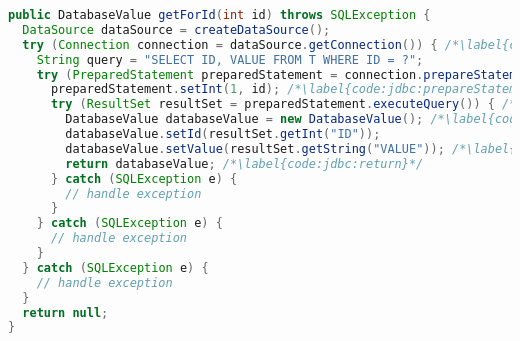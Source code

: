 
\begin{lstlisting}[language=Java, caption={Example of loading data using JDBC API \citep{JDBC_OVERVIEW}}, label={code:jdbc}]
public DatabaseValue getForId(int id) throws SQLException {
  DataSource dataSource = createDataSource();
  try (Connection connection = dataSource.getConnection()) { /*\label{code:jdbc:connection}*/
    String query = "SELECT ID, VALUE FROM T WHERE ID = ?";
    try (PreparedStatement preparedStatement = connection.prepareStatement(query)) { /*\label{code:jdbc:prepareStatement:begin}*/
      preparedStatement.setInt(1, id); /*\label{code:jdbc:prepareStatement:end}*/
      try (ResultSet resultSet = preparedStatement.executeQuery()) { /*\label{code:jdbc:executeQuery}*/
        DatabaseValue databaseValue = new DatabaseValue(); /*\label{code:jdbc:mapping:begin}*/
        databaseValue.setId(resultSet.getInt("ID"));
        databaseValue.setValue(resultSet.getString("VALUE")); /*\label{code:jdbc:mapping:end}*/
        return databaseValue; /*\label{code:jdbc:return}*/
      } catch (SQLException e) {
        // handle exception
      }
    } catch (SQLException e) {
      // handle exception
    }
  } catch (SQLException e) {
    // handle exception
  }
  return null;
}
\end{lstlisting}

